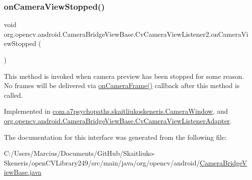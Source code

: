 \subsubsection{\texorpdfstring{on\+Camera\+View\+Stopped()}{onCameraViewStopped()}}
{\footnotesize\ttfamily void org.\+opencv.\+android.\+Camera\+Bridge\+View\+Base.\+Cv\+Camera\+View\+Listener2.\+on\+Camera\+View\+Stopped (\begin{DoxyParamCaption}{ }\end{DoxyParamCaption})}

This method is invoked when camera preview has been stopped for some reason. No frames will be delivered via \mbox{\hyperlink{interfaceorg_1_1opencv_1_1android_1_1_camera_bridge_view_base_1_1_cv_camera_view_listener2_aa8cf69267ec5580344728dbadbf6ae0f}{on\+Camera\+Frame()}} callback after this method is called. 

Implemented in \mbox{\hyperlink{classcom_1_1a7psychopaths_1_1skaitliukoskeneris_1_1_camera_window_a17537fd517c83369e27b6ff3f26b38e7}{com.\+a7psychopaths.\+skaitliukoskeneris.\+Camera\+Window}}, and \mbox{\hyperlink{classorg_1_1opencv_1_1android_1_1_camera_bridge_view_base_1_1_cv_camera_view_listener_adapter_aadb52c2d31eddad60a8d5295f66fe76e}{org.\+opencv.\+android.\+Camera\+Bridge\+View\+Base.\+Cv\+Camera\+View\+Listener\+Adapter}}.



The documentation for this interface was generated from the following file\+:\begin{DoxyCompactItemize}
\item 
C\+:/\+Users/\+Marcius/\+Documents/\+Git\+Hub/\+Skaitliuko-\/\+Skeneris/open\+C\+V\+Library249/src/main/java/org/opencv/android/\mbox{\hyperlink{_camera_bridge_view_base_8java}{Camera\+Bridge\+View\+Base.\+java}}\end{DoxyCompactItemize}
